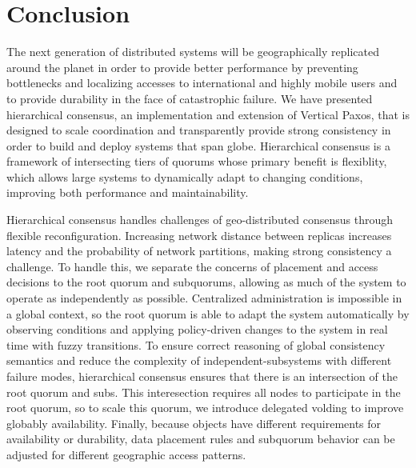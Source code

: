 \documentclass[11pt,conference]{IEEEtran}
\newcommand{\hc}{hierarchical consensus\xspace}
\newcommand{\Hc}{Hierarchical consensus\xspace}
\newcommand{\subs}{subquorums\xspace}
\newcommand{\roo}{root quorum\xspace}
\begin{document}




\section{Conclusion}

The next generation of distributed systems will be geographically replicated around the
planet in order to provide better performance by preventing bottlenecks and localizing
accesses to international and highly mobile users and to provide durability in the face
of catastrophic failure.
We have presented \hc, an implementation and extension of Vertical Paxos, that is
designed to scale coordination and transparently provide strong consistency in order to
build and deploy systems that span globe.
\Hc is a framework of intersecting tiers of quorums whose primary benefit is flexiblity,
which allows large systems to dynamically adapt to changing conditions, improving both
performance and maintainability.

\Hc handles challenges of geo-distributed consensus through flexible reconfiguration.
Increasing network distance between replicas increases latency and the probability of
network partitions, making strong consistency a challenge.
To handle this, we separate the concerns of placement and access decisions to the \roo
and \subs, allowing as much of the system to operate as independently as possible.
Centralized administration is impossible in a global context, so the \roo is able to
adapt the system automatically by observing conditions and applying policy-driven
changes to the system in real time with fuzzy transitions.
To ensure correct reasoning of global consistency semantics and reduce the complexity of
independent-subsystems with different failure modes, \hc ensures that there is an
intersection of the \roo and subs.
This interesection requires all nodes to participate in the root quorum, so to scale
this quorum, we introduce delegated volding to improve globably availability.
Finally, because objects have different requirements for availability or durability,
data placement rules and subquorum behavior can be adjusted for different geographic
access patterns.




\end{document}
